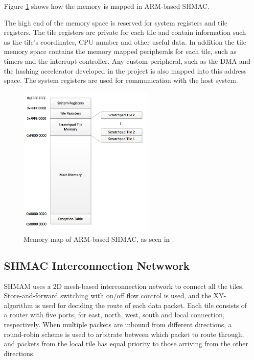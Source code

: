 Figure \ref{fig:shmac-memory} shows how the memory is mapped in ARM-based SHMAC.
%
%

The high end of the memory space is reserved for system registers and tile registers. 
The tile registers are private for each tile and contain information such as the tile's coordinates, CPU number and other useful data.
In addition the tile memory space contains the memory mapped peripherals for each tile, such as timers and the interrupt controller.
Any custom peripheral, such as the DMA and the hashing accelerator developed in the project is also mapped into this address space.
The system registers are used for communication with the host system.

\begin{figure}[htb]
    \centering
    \includegraphics[width=0.6\textwidth]{Figures/Heterogeneous/SHMACMemory}
    \caption{Memory map of ARM-based SHMAC, as seen in \cite{shmac-plan}.}
    \label{fig:shmac-memory}
\end{figure}

\subsection{SHMAC Interconnection Netwwork}

SHMAM uses a 2D mesh-based interconnection network to connect all the tiles.
Store-and-forward switching with on/off flow control is used, and the XY-algorithm is used for deciding the route of each data packet.
Each tile consists of a router with five ports, for east, north, west, south and local connection, respectively.
When multiple packets are inbound from different directions, a round-robin scheme is used to arbitrate between which
packet to route through, and packets from the local tile has equal priority to those arriving from the other directions.

